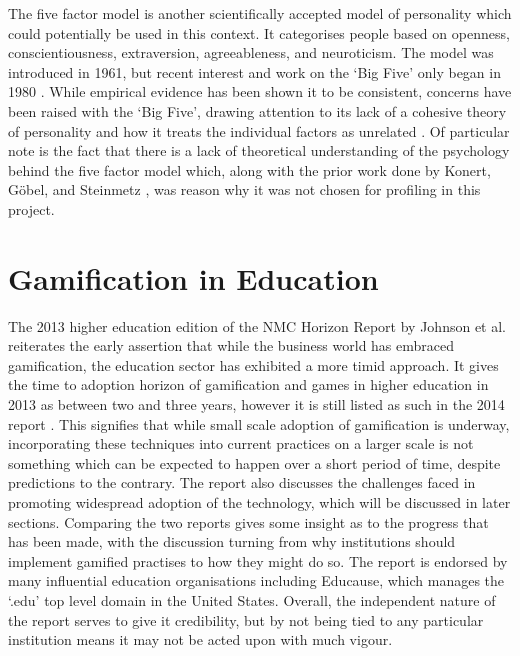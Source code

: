 \documentclass[12pt,a4paper,twoside]{report}
\begin{document}
The five factor model is another scientifically accepted model of personality which could potentially be used in this context. It categorises people based on openness, conscientiousness, extraversion, agreeableness, and neuroticism. The model was introduced in 1961, but recent interest and work on the `Big Five' only began in 1980 \cite{wiki-ffm}. While empirical evidence has been shown it to be consistent, concerns have been raised with the `Big Five', drawing attention to its lack of a cohesive theory of personality and how it treats the individual factors as unrelated \cite{block2010five} \cite{eysenck1992four}. Of particular note is the fact that there is a lack of theoretical understanding of the psychology behind the five factor model \cite{eysenck1992four} which, along with the prior work done by Konert, G{\"o}bel, and Steinmetz \cite{konertmodeling}, was reason why it was not chosen for profiling in this project.

\section{Gamification in Education}
The 2013 higher education edition of the NMC Horizon Report by Johnson et al. \cite{johnson2013nmc} reiterates the early assertion that while the business world has embraced gamification, the education sector has exhibited a more timid approach. It gives the time to adoption horizon of gamification and games in higher education in 2013 as between two and three years, however it is still listed as such in the 2014 report \cite{johnson2014nmc}. This signifies that while small scale adoption of gamification is underway, incorporating these techniques into current practices on a larger scale is not something which can be expected to happen over a short period of time, despite predictions to the contrary. The report also discusses the challenges faced in promoting widespread adoption of the technology, which will be discussed in later sections. Comparing the two reports gives some insight as to the progress that has been made, with the discussion turning from why institutions should implement gamified practises to how they might do so. The report is endorsed by many influential education organisations including Educause, which manages the `.edu' top level domain in the United States.  Overall, the independent nature of the report serves to give it credibility, but by not being tied to any particular institution means it may not be acted upon with much vigour.
\end{document}
